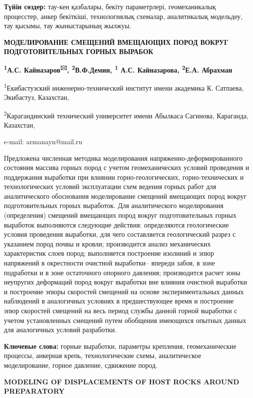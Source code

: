 {\bfseries Түйін сөздер:} тау-кен қазбалары, бекіту параметрлері,
геомеханикалық процесстер, анкер бекіткіші, технологиялық схемалар,
аналитикалық модельдеу, тау қысымы, тау жыныстарының жылжуы.

{\bfseries МОДЕЛИРОВАНИЕ СМЕЩЕНИЙ ВМЕЩАЮЩИХ ПОРОД ВОКРУГ ПОДГОТОВИТЕЛЬНЫХ
ГОРНЫХ ВЫРАБОК}

{\bfseries \textsuperscript{1}А.С. Кайназаров\textsuperscript{🖂},
\textsuperscript{2}В.Ф.Демин, \textsuperscript{1} А.С. Кайназарова,
\textsuperscript{2}Е.А. Абрахман}

\textsuperscript{1}Екибастузский инженерно-технический институт имени
академика К. Сатпаева, Экибастуз, Казахстан,

\textsuperscript{2}Карагандинский технический университет имени Абылкаса
Сагинова, Караганда, Казахстан,

e-mail: armanayn@mail.ru

Предложена численная методика моделирования напряженно-деформированного
состояния массива горных пород с учетом геомеханических условий
проведения и поддержания выработки при влиянии горно-геологических,
горно-технических и технологических условий эксплуатации схем ведения
горных работ для аналитического обоснования моделирование смещений
вмещающих пород вокруг подготовительных горных выработок. Для
аналитического моделирования (определения) смещений вмещающих пород
вокруг подготовительных горных выработок выполняются следующие действия:
определяются геологические условия проведения выработки, для чего
составляется геологический разрез с указанием пород почвы и кровли;
производится анализ механических характеристик слоев пород; выполняется
построение изолиний и эпюр напряжений в окрестности очистной выработки--
впереди забоя, в зоне подработки и в зоне остаточного опорного давления;
производится расчет зоны неупругих деформаций пород вокруг выработки вне
влияния очистной выработки и построение эпюры скоростей смещений на
основе экспериментальных данных наблюдений в аналогичных условиях в
предшествующее время и построение эпюр скоростей смещений на весь период
службы данной горной выработки с учетом установленных смещений путем
обобщения имеющихся опытных данных для аналогичных условий разработки.

{\bfseries Ключевые слова:} горные выработки, параметры крепления,
геомеханические процессы, анкерная крепь, технологические схемы,
аналитическое моделирование, горное давление, сдвижение пород.

{\bfseries MODELING OF DISPLACEMENTS OF HOST ROCKS AROUND PREPARATORY}

